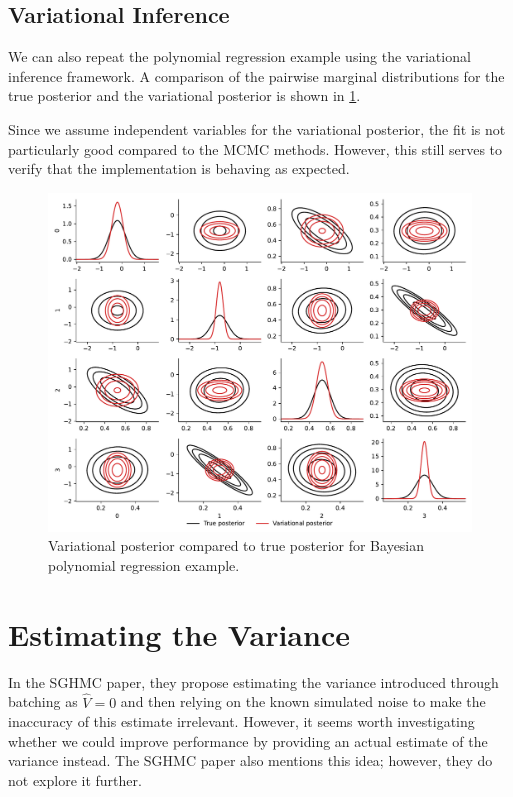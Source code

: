 \subsection{Variational Inference} 
We can also repeat the polynomial regression example using the variational inference framework.
A comparison of the pairwise marginal distributions for the true posterior and the variational posterior is shown in \cref{fig:vi-simulated}. 

Since we assume independent variables for the variational posterior, the fit is not particularly good compared to the MCMC methods. 
However, this still serves to verify that the implementation is behaving as expected.
\begin{figure}[htbp]
    \centering
    \includegraphics[width=\linewidth]{Figures/vi-simulated.pdf}
    \caption{Variational posterior compared to true posterior for Bayesian polynomial regression example.}
    \label{fig:vi-simulated}
\end{figure}


\section{Estimating the Variance}

In the SGHMC paper, they propose estimating the variance introduced through batching as $\hat{V}=0$ and then relying on the known simulated noise to make the inaccuracy of this estimate irrelevant. 
However, it seems worth investigating whether we could improve performance by providing an actual estimate of the variance instead. 
The SGHMC paper also mentions this idea; however, they do not explore it further. 

